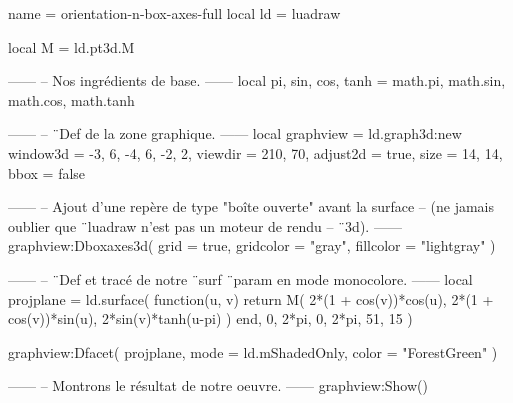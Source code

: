 \documentclass[border = 3pt]{standalone}
\begin{document}
\begin{luadraw*}{name = orientation-n-box-axes-full}
local ld = luadraw

local M = ld.pt3d.M

------
-- Nos ingrédients de base.
------
local pi, sin, cos, tanh = math.pi, math.sin, math.cos, math.tanh

------
-- ¨Def de la zone graphique.
------
local graphview = ld.graph3d:new{
  window3d = {-3, 6, -4, 6, -2, 2},
  viewdir  = {210, 70},
  adjust2d = true,
  size     = {14, 14},
  bbox     = false
}

------
-- Ajout d'une repère de type "boîte ouverte" avant la surface
-- (ne jamais oublier que ¨luadraw n'est pas un moteur de rendu
-- ¨3d).
------
graphview:Dboxaxes3d({
  grid      = true,
  gridcolor = "gray",
  fillcolor = "lightgray"
})

------
-- ¨Def et tracé de notre ¨surf ¨param en mode monocolore.
------
local projplane = ld.surface(
  function(u, v)
    return M(
      2*(1 + cos(v))*cos(u),
      2*(1 + cos(v))*sin(u),
      2*sin(v)*tanh(u-pi)
    )
  end,
  0, 2*pi, 0, 2*pi,
  {51, 15}
)

graphview:Dfacet(
  projplane,
  {
    mode  = ld.mShadedOnly,
    color = "ForestGreen"
  }
)

------
-- Montrons le résultat de notre oeuvre.
------
graphview:Show()
\end{luadraw*}
\end{document}
